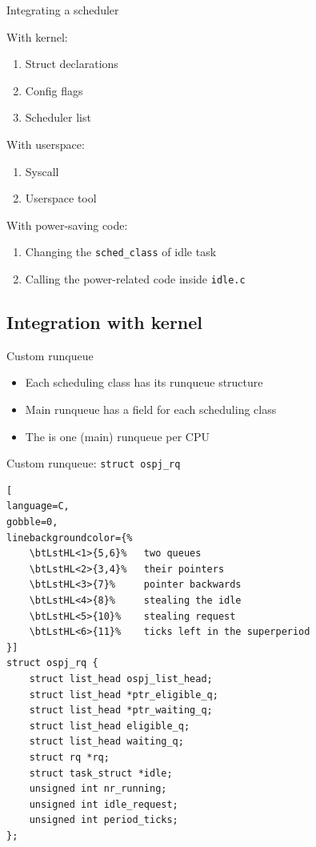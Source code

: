 \begin{frame}{Integrating a scheduler}

{
    With kernel:
    \begin{enumerate}
        \item Struct declarations
        \item Config flags
        \item Scheduler list
    \end{enumerate}
}\pause 

{
    With userspace:
    \begin{enumerate}
        \item Syscall
        \item Userspace tool
    \end{enumerate}
}\pause

{
    With power-saving code:
    \begin{enumerate}
         \item Changing the \texttt{sched\_class} of idle task
         \item Calling the power-related code inside \texttt{idle.c}
    \end{enumerate}
}
\end{frame}

%
%
\subsection{Integration with kernel}

\begin{frame}{Custom runqueue}
    \begin{itemize}
        \item Each scheduling class has its runqueue structure \pause
        \item Main runqueue has a field for each scheduling class \pause
        \item The is one (main) runqueue per CPU
    \end{itemize}
\end{frame}

\begin{frame}[fragile]{Custom runqueue: \texttt{struct ospj\_rq}}
\begin{lstlisting}[
language=C,
gobble=0,
linebackgroundcolor={%
    \btLstHL<1>{5,6}%   two queues
    \btLstHL<2>{3,4}%   their pointers
    \btLstHL<3>{7}%     pointer backwards
    \btLstHL<4>{8}%     stealing the idle
    \btLstHL<5>{10}%    stealing request
    \btLstHL<6>{11}%    ticks left in the superperiod
}]
struct ospj_rq {
    struct list_head ospj_list_head;
    struct list_head *ptr_eligible_q;
    struct list_head *ptr_waiting_q;
    struct list_head eligible_q;
    struct list_head waiting_q;
    struct rq *rq;
    struct task_struct *idle;
    unsigned int nr_running;
    unsigned int idle_request;
    unsigned int period_ticks;
};
\end{lstlisting}
\end{frame}

